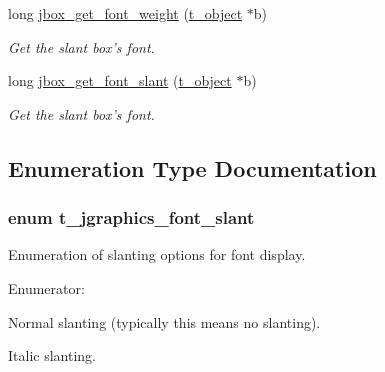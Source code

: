\begin{DoxyCompactItemize}
long \hyperlink{group__jfont_gabff7a5c0793cab2aed118f82ab3d520a}{jbox\_\-get\_\-font\_\-weight} (\hyperlink{structt__object}{t\_\-object} $\ast$b)
\begin{DoxyCompactList}\small\item\em Get the slant box's font. \item\end{DoxyCompactList}\item 
long \hyperlink{group__jfont_ga98bc2063c505fb26829605e940ffc6d4}{jbox\_\-get\_\-font\_\-slant} (\hyperlink{structt__object}{t\_\-object} $\ast$b)
\begin{DoxyCompactList}\small\item\em Get the slant box's font. \item\end{DoxyCompactList}\end{DoxyCompactItemize}


\subsection{Enumeration Type Documentation}
\hypertarget{group__jfont_gaea63403193677b088b56cb60c69c37b4}{
\subsubsection[{t\_\-jgraphics\_\-font\_\-slant}]{\setlength{\rightskip}{0pt plus 5cm}enum {\bf t\_\-jgraphics\_\-font\_\-slant}}}
\label{group__jfont_gaea63403193677b088b56cb60c69c37b4}


Enumeration of slanting options for font display. \begin{Desc}
\item[Enumerator: ]\par
\begin{description}
\item[{\em 
\hypertarget{group__jfont_ggaea63403193677b088b56cb60c69c37b4a42c9269c412c5cfaf42db4db88add2a8}{
JGRAPHICS\_\-FONT\_\-SLANT\_\-NORMAL}
\label{group__jfont_ggaea63403193677b088b56cb60c69c37b4a42c9269c412c5cfaf42db4db88add2a8}
}]Normal slanting (typically this means no slanting). \item[{\em 
\hypertarget{group__jfont_ggaea63403193677b088b56cb60c69c37b4a66269b2de097def1c7d8100683cae0da}{
JGRAPHICS\_\-FONT\_\-SLANT\_\-ITALIC}
\label{group__jfont_ggaea63403193677b088b56cb60c69c37b4a66269b2de097def1c7d8100683cae0da}
}]Italic slanting. \end{description}
\end{Desc}

